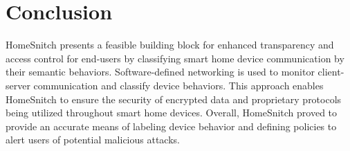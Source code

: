 \section{Conclusion} 
\label{sec:conclusion}

HomeSnitch presents a feasible building block for enhanced transparency and access control for end-users by classifying smart home device communication by their semantic behaviors. Software-defined networking is used to monitor client-server communication and classify device behaviors. This approach enables HomeSnitch to ensure the security of encrypted data and proprietary protocols being utilized throughout smart home devices. Overall, HomeSnitch proved to provide an accurate means of labeling device behavior and defining policies to alert users of potential malicious attacks.